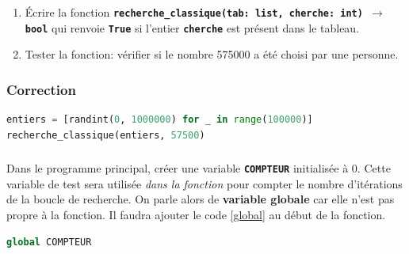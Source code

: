 \documentclass[svgnames,11pt]{beamer}
\begin{document}
\begin{frame}[fragile]
    \frametitle{}

    \begin{activite}
        \begin{enumerate}
            \item Écrire la fonction \textbf{\texttt{recherche\_classique(tab: list, cherche: int) $\rightarrow$ bool}} qui renvoie \textbf{\texttt{True}} si l'entier \textbf{\texttt{cherche}} est présent dans le tableau.
            \item Tester la fonction: vérifier si le nombre 575000 a été choisi par une personne.
        \end{enumerate}
    \end{activite} 
\end{frame}
\begin{frame}[fragile]
    \frametitle{Correction}

    \begin{center}
        
    \end{center}

    \begin{center}
    \begin{lstlisting}[language=Python , basicstyle=\ttfamily\small, xleftmargin=0.2em, xrightmargin=-2em]
entiers = [randint(0, 1000000) for _ in range(100000)]
recherche_classique(entiers, 57500)
\end{lstlisting}
    \label{CODE}
    \end{center}
\end{frame}
\begin{frame}[fragile]
    \frametitle{}
    \setcounter{compteuractivite}{1}

    \begin{activite}
        Dans le programme principal, créer une variable \textbf{\texttt{COMPTEUR}} initialisée à 0. Cette variable de test sera utilisée \emph{dans la fonction} pour compter le nombre d'itérations de la boucle de recherche. On parle alors de \textbf{variable globale} car elle n'est pas propre à la fonction. Il faudra ajouter le code \ref{global} au début de la fonction.
        \begin{center}
        \begin{lstlisting}[language=Python  , xleftmargin=2em, xrightmargin=2em]
global COMPTEUR
\end{lstlisting}
        \label{global}
        \end{center}
    \end{activite}

\end{frame}
\end{document}
